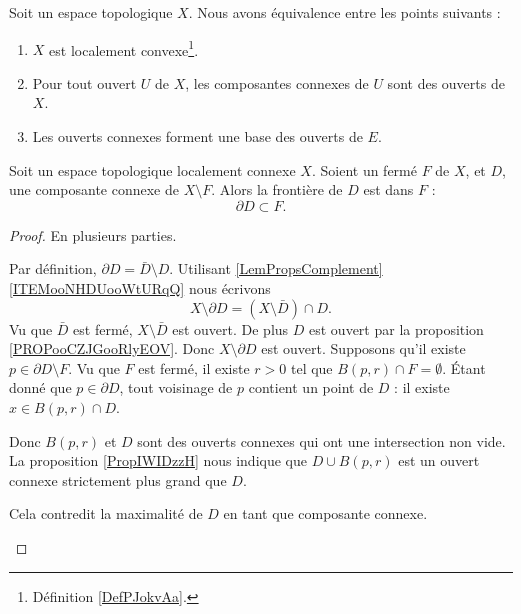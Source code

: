 \begin{proposition}   \label{PROPooCZJGooRlyEOV}
	Soit un espace topologique \( X\). Nous avons équivalence entre les points suivants :
	\begin{enumerate}
		\item
		      \( X\) est localement convexe\footnote{Définition \ref{DefPJokvAa}.}.
		\item
		      Pour tout ouvert \( U\) de \( X\), les composantes connexes de \( U\) sont des ouverts de \( X\).
		\item
		      Les ouverts connexes forment une base des ouverts de \( E\).
	\end{enumerate}
\end{proposition}

\begin{lemma}     \label{LEMooWGOCooHSoCzb}
	Soit un espace topologique localement connexe \( X\). Soient un fermé \( F\) de \( X\), et \( D\), une composante connexe de \( X\setminus F\). Alors la frontière de \( D\) est dans \( F\) :
	\begin{equation}
		\partial D\subset F.
	\end{equation}
\end{lemma}

\begin{proof}
	En plusieurs parties.
	\begin{subproof}
		Par définition, \( \partial D=\bar D\setminus D\). Utilisant \ref{LemPropsComplement}\ref{ITEMooNHDUooWtURqQ} nous écrivons
		\begin{equation}
			X\setminus \partial D=(X\setminus \bar D)\cap D.
		\end{equation}
		Vu que \( \bar D\) est fermé, \( X\setminus \bar D\) est ouvert. De plus \( D\) est ouvert par la proposition \ref{PROPooCZJGooRlyEOV}. Donc \( X\setminus\partial D\) est ouvert.
		Supposons qu'il existe \( p\in\partial D\setminus F\). Vu que \( F\) est fermé, il existe \( r>0\) tel que \( B(p,r)\cap F=\emptyset\). Étant donné que \( p\in\partial D\), tout voisinage de \( p\) contient un point de \( D\) : il existe \( x\in B(p,r)\cap D\).

		Donc \( B(p,r)\) et \( D\) sont des ouverts connexes qui ont une intersection non vide. La proposition \ref{PropIWIDzzH} nous indique que \( D\cup B(p,r)\) est un ouvert connexe strictement plus grand que \( D\).

		Cela contredit la maximalité de \( D\) en tant que composante connexe.
	\end{subproof}
\end{proof}

